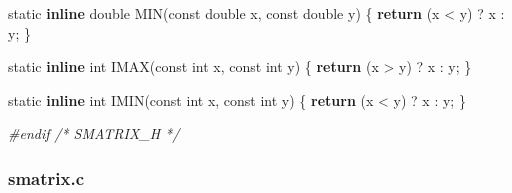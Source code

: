 \documentclass[12pt,]{article}
\newenvironment{Shaded}{\begin{snugshade}}{\end{snugshade}}
\newcommand{\CommentTok}[1]{\textcolor[rgb]{0.56,0.35,0.01}{\textit{#1}}}
\newcommand{\ControlFlowTok}[1]{\textcolor[rgb]{0.13,0.29,0.53}{\textbf{#1}}}
\newcommand{\DataTypeTok}[1]{\textcolor[rgb]{0.13,0.29,0.53}{#1}}
\newcommand{\KeywordTok}[1]{\textcolor[rgb]{0.13,0.29,0.53}{\textbf{#1}}}
\newcommand{\NormalTok}[1]{#1}
\newcommand{\PreprocessorTok}[1]{\textcolor[rgb]{0.56,0.35,0.01}{\textit{#1}}}
\begin{document}
\begin{Shaded}
\begin{Highlighting}[]
\DataTypeTok{static} \KeywordTok{inline} \DataTypeTok{double}\NormalTok{ MIN(}\DataTypeTok{const} \DataTypeTok{double}\NormalTok{ x, }\DataTypeTok{const} \DataTypeTok{double}\NormalTok{ y) \{}
  \ControlFlowTok{return}\NormalTok{ (x < y) ? x : y;}
\NormalTok{\}}

\DataTypeTok{static} \KeywordTok{inline} \DataTypeTok{int}\NormalTok{ IMAX(}\DataTypeTok{const} \DataTypeTok{int}\NormalTok{ x, }\DataTypeTok{const} \DataTypeTok{int}\NormalTok{ y) \{ }\ControlFlowTok{return}\NormalTok{ (x > y) ? x : y; \}}

\DataTypeTok{static} \KeywordTok{inline} \DataTypeTok{int}\NormalTok{ IMIN(}\DataTypeTok{const} \DataTypeTok{int}\NormalTok{ x, }\DataTypeTok{const} \DataTypeTok{int}\NormalTok{ y) \{ }\ControlFlowTok{return}\NormalTok{ (x < y) ? x : y; \}}


\PreprocessorTok{#endif }\CommentTok{/* SMATRIX_H */}
\end{Highlighting}
\end{Shaded}

\hypertarget{smatrix.c}{%
\subsubsection{smatrix.c}\label{smatrix.c}}
\end{document}
